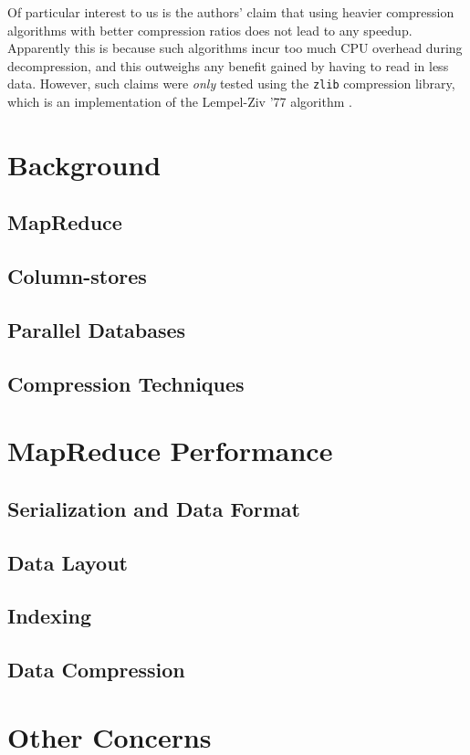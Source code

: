 \documentclass[twocolumn]{article}
\begin{document}
Of particular interest to us is the authors' claim that using heavier compression
algorithms with better compression ratios does not lead to any speedup.  Apparently
this is because such algorithms incur too much CPU overhead during decompression,
and this outweighs any benefit gained by having to read in less data.  However,
such claims were \emph{only} tested using the \verb+zlib+ compression library,
which is an implementation of the Lempel-Ziv '77 algorithm \cite{ref:lz77}.

\section{Background}
\subsection{MapReduce}
\subsection{Column-stores}
\subsection{Parallel Databases}
\subsection{Compression Techniques}

\section{MapReduce Performance}
\subsection{Serialization and Data Format}
\subsection{Data Layout}
\subsection{Indexing}
\subsection{Data Compression}

\section{Other Concerns}
\end{document}
